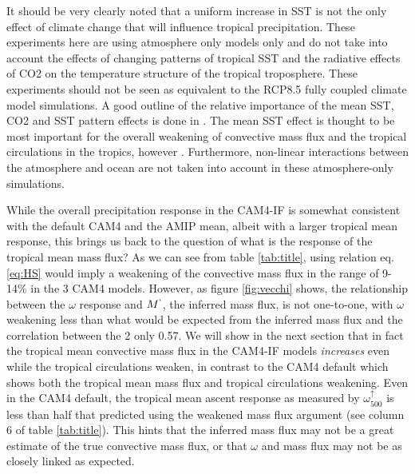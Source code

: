 \documentclass[letterpaper,12pt,titlepage,oneside,final]{book}
\begin{document}
It should be very clearly noted that a uniform increase in SST is not the only effect of climate change that will influence tropical precipitation. These experiments here are using atmosphere only models only and do not take into account the effects of changing patterns of tropical SST and the radiative effects of CO2 on the temperature structure of the tropical troposphere. These experiments should not be seen as equivalent to the RCP8.5 fully coupled climate model simulations. A good outline of the relative importance of the mean SST, CO2 and SST pattern effects is done in \citep{he_anthropogenic_2015}. The mean SST effect is thought to be most important for the overall weakening of convective mass flux and the tropical circulations in the tropics, however \citep{held_robust_2006,ma_mechanisms_2011,vecchi_global_2007,he_anthropogenic_2015}. Furthermore, non-linear interactions between the atmosphere and ocean are not taken into account in these atmosphere-only simulations.

While the overall precipitation response in the CAM4-IF is somewhat consistent with the default CAM4 and the AMIP mean, albeit with a larger tropical mean response, this brings us back to the question of what is the response of the tropical mean mass flux? As we can see from table \ref{tab:title}, using relation eq. \ref{eq:HS} would imply a weakening of the convective mass flux in the range of 9-14\% in the 3 CAM4 models. However, as figure \ref{fig:vecchi} shows, the relationship between the $\omega$ response and $M^{`}$, the inferred mass flux, is not one-to-one, with $\omega$ weakening less than what would be expected from the inferred mass flux and the correlation between the 2 only 0.57. We will show in the next section that in fact the tropical mean convective mass flux in the CAM4-IF models \textit{increases} even while the tropical circulations weaken, in contrast to the CAM4 default which shows both the tropical mean mass flux and tropical circulations weakening. Even in the CAM4 default, the tropical mean ascent response as measured by $\omega_{500}^{\uparrow}$ is less than half that predicted using the weakened mass flux argument (see column 6 of table \ref{tab:title}). This hints that the inferred mass flux may not be a great estimate of the true convective mass flux, or that $\omega$ and mass flux may not be as closely linked as expected.
\end{document}
